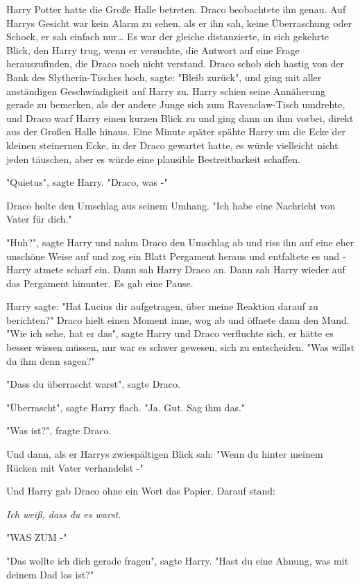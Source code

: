 {Harry Potter hatte die Große Halle betreten. Draco beobachtete ihn genau. Auf Harrys Gesicht war kein Alarm zu sehen, als er ihn sah, keine Überraschung oder Schock, er sah einfach nur… Es war der gleiche distanzierte, in sich gekehrte Blick, den Harry trug, wenn er versuchte, die Antwort auf eine Frage herauszufinden, die Draco noch nicht verstand. Draco schob sich hastig von der Bank des Slytherin-Tisches hoch, sagte: "Bleib zurück", und ging mit aller anständigen Geschwindigkeit auf Harry zu. Harry schien seine Annäherung gerade zu bemerken, als der andere Junge sich zum Ravenclaw-Tisch umdrehte, und Draco warf Harry einen kurzen Blick zu und ging dann an ihm vorbei, direkt aus der Großen Halle hinaus. Eine Minute später spähte Harry um die Ecke der kleinen steinernen Ecke, in der Draco gewartet hatte, es würde vielleicht nicht jeden täuschen, aber es würde eine plausible Bestreitbarkeit schaffen.

"Quietus", sagte Harry. "Draco, was -"

Draco holte den Umschlag aus seinem Umhang. "Ich habe eine Nachricht von Vater für dich."

"Huh?", sagte Harry und nahm Draco den Umschlag ab und riss ihn auf eine eher unschöne Weise auf und zog ein Blatt Pergament heraus und entfaltete es und - Harry atmete scharf ein. Dann sah Harry Draco an. Dann sah Harry wieder auf das Pergament hinunter. Es gab eine Pause.

Harry sagte: "Hat Lucius dir aufgetragen, über meine Reaktion darauf zu berichten?" Draco hielt einen Moment inne, wog ab und öffnete dann den Mund.\\ "Wie ich sehe, hat er das", sagte Harry und Draco verfluchte sich, er hätte es besser wissen müssen, nur war es schwer gewesen, sich zu entscheiden. "Was willst du ihm denn sagen?"

"Dass du überrascht warst", sagte Draco.

"Überrascht", sagte Harry flach. "Ja. Gut. Sag ihm das."

"Was ist?", fragte Draco.

Und dann, als er Harrys zwiespältigen Blick sah: "Wenn du hinter meinem Rücken mit Vater verhandelst -"

Und Harry gab Draco ohne ein Wort das Papier. Darauf stand:

\emph{Ich weiß, dass du es warst.}

"WAS ZUM -"

"Das wollte ich dich gerade fragen", sagte Harry. "Hast du eine Ahnung, was mit deinem Dad los ist?"

}
